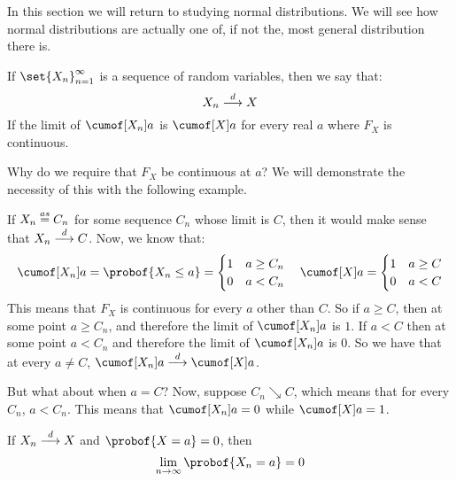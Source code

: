 In this section we will return to studying normal distributions.
We will see how normal distributions are actually one of, if not the, most general distribution there is.

\begin{defn*}

	If $\set{X_n}_{n=1}^\infty$ is a sequence of random variables, then we say that:
	\[ X_n\mathrel{\overset d\longrightarrow} X \]
	If the limit of $\cumof[X_n]a$ is $\cumof[X]a$ for every real $a$ where $F_X$ is continuous.

\end{defn*}

Why do we require that $F_X$ be continuous at $a$?
We will demonstrate the necessity of this with the following example.

\begin{exam}

	If $X_n\mathrel{\overset{as}=} C_n$ for some sequence $C_n$ whose limit is $C$, then it would make sense that $X_n\mathrel{\overset d\longrightarrow} C$.
	Now, we know that:
	\[ \cumof[X_n]a = \probof{X_n\leq a} = \begin{cases} 1 & a\geq C_n \\ 0 & a<C_n \end{cases} \quad
	\cumof[X]a = \begin{cases} 1 & a\geq C \\ 0 & a<C \end{cases} \]
	This means that $F_X$ is continuous for every $a$ other than $C$.
	So if $a\geq C$, then at some point $a\geq C_n$, and therefore the limit of $\cumof[X_n]a$ is $1$.
	If $a<C$ then at some point $a<C_n$ and therefore the limit of $\cumof[X_n]a$ is $0$.
	So we have that at every $a\neq C$, $\cumof[X_n]a\dilim\cumof[X]a$.

	But what about when $a=C$?
	Now, suppose $C_n\searrow C$, which means that for every $C_n$, $a<C_n$.
	This means that $\cumof[X_n]a=0$ while $\cumof[X]a=1$.

\end{exam}

\begin{prop*}

	If $X_n\mathrel{\overset d\longrightarrow} X$ and $\probof{X=a}=0$, then
	\[ \lim_{n\to\infty}\probof{X_n=a} = 0 \]

\end{prop*}

